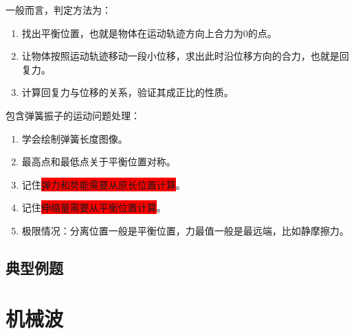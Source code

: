 \documentclass{lesson}
\begin{document}
一般而言，判定方法为：
\begin{enumerate}
	\item 找出平衡位置，也就是物体在运动轨迹方向上合力为0的点。
	\item 让物体按照运动轨迹移动一段小位移，求出此时沿位移方向的合力，也就是回复力。
	\item 计算回复力与位移的关系，验证其成正比的性质。
\end{enumerate}
包含弹簧振子的运动问题处理：
\begin{enumerate}
	\item 学会绘制弹簧长度图像。
	\item 最高点和最低点关于平衡位置对称。
	\item 记住\colorbox{red}{弹力和势能需要从原长位置计算}。
	\item 记住\colorbox{red}{伸缩量需要从平衡位置计算}。
	\item 极限情况：分离位置一般是平衡位置，力最值一般是最远端，比如静摩擦力。
\end{enumerate}
\subsection{典型例题}
\section{机械波}
\end{document}
